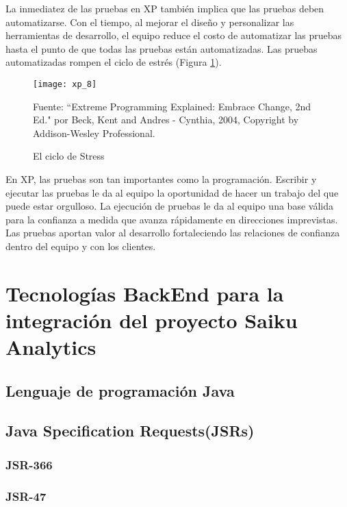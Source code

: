 \begin{spacing}{1.5}
		La inmediatez de las pruebas en XP también implica que las pruebas deben automatizarse. Con el tiempo, al mejorar el diseño y personalizar las herramientas de desarrollo, el equipo reduce el costo de automatizar las pruebas hasta el punto de que todas las pruebas están automatizadas. Las pruebas automatizadas rompen el ciclo de estrés (Figura \ref{figure:chaperII_9}).
		
		\begin{figure}[H]
			\centering
			\texttt{[image: xp\_8]}
			\caption {\centering \small{El ciclo de Stress}} \label{figure:chaperII_9}
			\small {Fuente: ``Extreme Programming Explained: Embrace Change, 2nd Ed." por Beck, Kent and Andres - Cynthia, 2004, Copyright by Addison-Wesley Professional.}
		\end{figure}
		
		En XP, las pruebas son tan importantes como la programación. Escribir y ejecutar las pruebas le da al equipo la oportunidad de hacer un trabajo del que puede estar orgulloso. La ejecución de pruebas le da al equipo una base válida para la confianza a medida que avanza rápidamente en direcciones imprevistas. Las pruebas aportan valor al desarrollo fortaleciendo las relaciones de confianza dentro del equipo y con los clientes.
\section{Tecnolog\'{i}as BackEnd para la integraci\'{o}n del proyecto Saiku Analytics}
		\lipsum[1-2]
	\subsection{Lenguaje de programaci\'{o}n Java}
			\lipsum[1-2]
	\subsection{Java Specification Requests(JSRs)}
		\subsubsection{JSR-366}
				\lipsum[1-2]
		\subsubsection{JSR-47}
				\lipsum[1-2]

\end{spacing}
